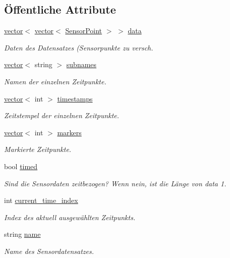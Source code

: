\subsection*{Öffentliche Attribute}
\begin{DoxyCompactItemize}
\item 
\hyperlink{classstd_1_1vector}{vector}$<$ \hyperlink{classstd_1_1vector}{vector}$<$ \hyperlink{structUtils_1_1SensorPoint}{Sensor\-Point} $>$ $>$ \hyperlink{structUtils_1_1SensorData_ae94e7645dc0b6adfd21571b0abd5e309}{data}
\begin{DoxyCompactList}\small\item\em Daten des Datensatzes (Sensorpunkte zu versch. \end{DoxyCompactList}\item 
\hyperlink{classstd_1_1vector}{vector}$<$ string $>$ \hyperlink{structUtils_1_1SensorData_ad5875ab7e8ebdc9dc41a7b9ef1c063ba}{subnames}
\begin{DoxyCompactList}\small\item\em Namen der einzelnen Zeitpunkte. \end{DoxyCompactList}\item 
\hyperlink{classstd_1_1vector}{vector}$<$ int $>$ \hyperlink{structUtils_1_1SensorData_a654f9606c3ddc6e93afb86a116d11ea5}{timestamps}
\begin{DoxyCompactList}\small\item\em Zeitstempel der einzelnen Zeitpunkte. \end{DoxyCompactList}\item 
\hyperlink{classstd_1_1vector}{vector}$<$ int $>$ \hyperlink{structUtils_1_1SensorData_ac2d7e037f39affd6ad9d4aa29ed579da}{markers}
\begin{DoxyCompactList}\small\item\em Markierte Zeitpunkte. \end{DoxyCompactList}\item 
bool \hyperlink{structUtils_1_1SensorData_aca94c3ec7e8f2e719f7cfcff4e9da41b}{timed}
\begin{DoxyCompactList}\small\item\em Sind die Sensordaten zeitbezogen? Wenn nein, ist die Länge von data 1. \end{DoxyCompactList}\item 
int \hyperlink{structUtils_1_1SensorData_a177d53154d56fcf1962f969ece1e7d9d}{current\-\_\-time\-\_\-index}
\begin{DoxyCompactList}\small\item\em Index des aktuell ausgewählten Zeitpunkts. \end{DoxyCompactList}\item 
string \hyperlink{structUtils_1_1SensorData_a52474d0fe0dce0d3ee73c007a150a507}{name}
\begin{DoxyCompactList}\small\item\em Name des Sensordatensatzes. \end{DoxyCompactList}\end{DoxyCompactItemize}


